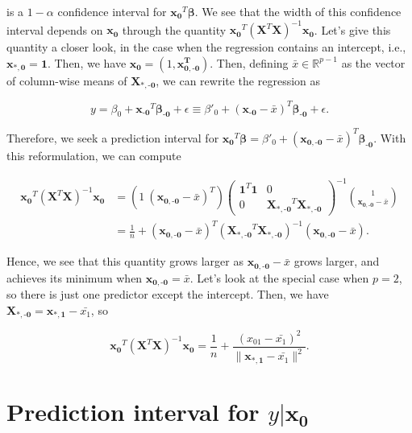 \documentclass[
  11pt,
  letterpaper,
  oneside]{book}
\theoremstyle{definition}
\theoremstyle{plain}
\theoremstyle{plain}
\theoremstyle{plain}
\theoremstyle{remark}
\begin{document}
is a \(1-\alpha\) confidence interval for
\(\boldsymbol{x_0}^T \boldsymbol{\beta}\). We see that the width of this
confidence interval depends on \(\boldsymbol{x_0}\) through the quantity
\(\boldsymbol{x_0}^T (\boldsymbol{X}^T \boldsymbol{X})^{-1} \boldsymbol{x_0}\).
Let's give this quantity a closer look, in the case when the regression
contains an intercept, i.e., \(\boldsymbol{x_{*,0}} = \boldsymbol{1}\).
Then, we have
\(\boldsymbol{x_0} = (1, \boldsymbol{x^T_{0,\text{-}0}})\). Then,
defining \(\bar{x} \in \mathbb{R}^{p-1}\) as the vector of column-wise
means of \(\boldsymbol{X_{*,\text{-}0}}\), we can rewrite the regression
as

\[
y = \beta_0 + \boldsymbol{x_{\text{-}0}}^T \boldsymbol{\beta_{\text{-}0}} + \epsilon \equiv \beta'_0 + (\boldsymbol{x_{\text{-}0}}-\bar{x})^T  \boldsymbol{\beta_{\text{-}0}} + \epsilon.
\]

Therefore, we seek a prediction interval for
\(\boldsymbol{x_{0}}^T \boldsymbol{\beta} = \beta'_0 + (\boldsymbol{x_{0, \text{-}0}}-\bar{x})^T \boldsymbol{\beta_{\text{-}0}}\).
With this reformulation, we can compute

\[
\begin{split}
\boldsymbol{x_0}^T (\boldsymbol{X}^T \boldsymbol{X})^{-1} \boldsymbol{x_0} &= (1 \ (\boldsymbol{x_{0, \text{-}0}}-\bar{x})^T)\begin{pmatrix}\boldsymbol{1}^T \boldsymbol{1} & 0 \\ 0 &\boldsymbol{X_{*,\text{-}0}}^T \boldsymbol{X_{*,\text{-}0}} \end{pmatrix}^{-1}{1 \choose \boldsymbol{x_{0, \text{-}0}}-\bar{x}} \\
&= \frac{1}{n} + (\boldsymbol{x_{0, \text{-}0}}-\bar{x})^T (\boldsymbol{X_{*,\text{-}0}}^T \boldsymbol{X_{*,\text{-}0}})^{-1}(\boldsymbol{x_{0, \text{-}0}}-\bar{x}).
\end{split}
\]

Hence, we see that this quantity grows larger as
\(\boldsymbol{x_{0, \text{-}0}}-\bar{x}\) grows larger, and achieves its
minimum when \(\boldsymbol{x_{0, \text{-}0}}=\bar{x}\). Let's look at
the special case when \(p = 2\), so there is just one predictor except
the intercept. Then, we have
\(\boldsymbol{X_{*,\text{-}0}} = \boldsymbol{x_{*,1}}-\bar{x_1}\), so

\[
\boldsymbol{x_0}^T (\boldsymbol{X}^T \boldsymbol{X})^{-1} \boldsymbol{x_0} = \frac{1}{n} + \frac{(x_{01}-\bar{x_1})^2}{\|\boldsymbol{x_{*,1}}-\bar{x_1}\|^2}.
\]

\hypertarget{prediction-interval-for-yboldsymbolx_0}{%
\section{\texorpdfstring{Prediction interval for
\(y|\boldsymbol{x_0}\)}{Prediction interval for y\textbar\textbackslash boldsymbol\{x\_0\}}}\label{prediction-interval-for-yboldsymbolx_0}}
\end{document}
